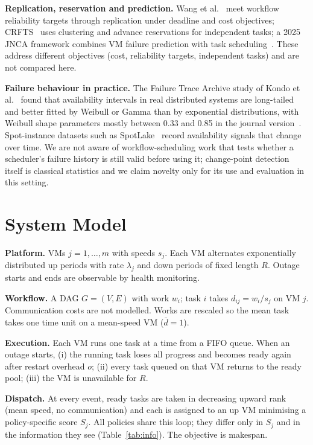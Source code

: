 \documentclass[conference]{IEEEtran}
\begin{document}
\textbf{Replication, reservation and prediction.} Wang et al.~\cite{wang2026reliable} meet workflow
reliability targets through replication under deadline and cost objectives; CRFTS~\cite{mushtaq2025crfts}
uses clustering and advance reservations for independent tasks; a 2025 JNCA framework combines VM
failure prediction with task scheduling~\cite{jnca2025robust}. These address different objectives
(cost, reliability targets, independent tasks) and are not compared here.

\textbf{Failure behaviour in practice.} The Failure Trace Archive study of Kondo et al.~\cite{kondo2010fta}
found that availability intervals in real distributed systems are long-tailed and better fitted by
Weibull or Gamma than by exponential distributions, with Weibull shape parameters mostly between
0.33 and 0.85 in the journal version~\cite{javadi2013fta}. Spot-instance datasets such as SpotLake~\cite{lee2022spotlake}
record availability signals that change over time. We are not aware of workflow-scheduling work that tests whether a
scheduler's failure history is still valid before using it; change-point detection itself is classical
statistics and we claim novelty only for its use and evaluation in this setting.

\section{System Model}
\textbf{Platform.} VMs $j=1,\dots,m$ with speeds $s_j$. Each VM alternates exponentially distributed
up periods with rate $\lambda_j$ and down periods of fixed length $R$. Outage starts and ends are
observable by health monitoring.

\textbf{Workflow.} A DAG $G=(V,E)$ with work $w_i$; task $i$ takes $d_{ij}=w_i/s_j$ on VM $j$.
Communication costs are not modelled. Works are rescaled so the mean task takes one time unit on a
mean-speed VM ($\bar d = 1$).

\textbf{Execution.} Each VM runs one task at a time from a FIFO queue. When an outage starts,
(i) the running task loses all progress and becomes ready again after restart overhead $o$;
(ii) every task queued on that VM returns to the ready pool; (iii) the VM is unavailable for $R$.

\textbf{Dispatch.} At every event, ready tasks are taken in decreasing upward rank~\cite{topcuoglu2002heft}
(mean speed, no communication) and each is assigned to an up VM minimising a policy-specific score
$S_j$. All policies share this loop; they differ only in $S_j$ and in the information they see
(Table~\ref{tab:info}). The objective is makespan.
\end{document}
